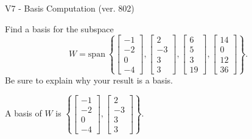 \begin{exercise}
  \begin{exerciseTitle}V7 - Basis Computation (ver. 802)\end{exerciseTitle}
  \begin{exerciseStatement}
    Find a basis for the subspace 
\[W=\mathrm{span}\ \left\{\left[\begin{array}{r}
-1 \\
-2 \\
0 \\
-4
\end{array}\right] , \left[\begin{array}{r}
2 \\
-3 \\
3 \\
3
\end{array}\right] , \left[\begin{array}{r}
6 \\
5 \\
3 \\
19
\end{array}\right] , \left[\begin{array}{r}
14 \\
0 \\
12 \\
36
\end{array}\right]\right\}.\]
 Be sure to explain why your result is a basis.


  \end{exerciseStatement}
  \begin{exerciseAnswer}
   A basis of \(W\) is  \(\left\{\left[\begin{array}{r}
-1 \\
-2 \\
0 \\
-4
\end{array}\right] , \left[\begin{array}{r}
2 \\
-3 \\
3 \\
3
\end{array}\right]\right\}\).
  


  \end{exerciseAnswer}
\end{exercise}